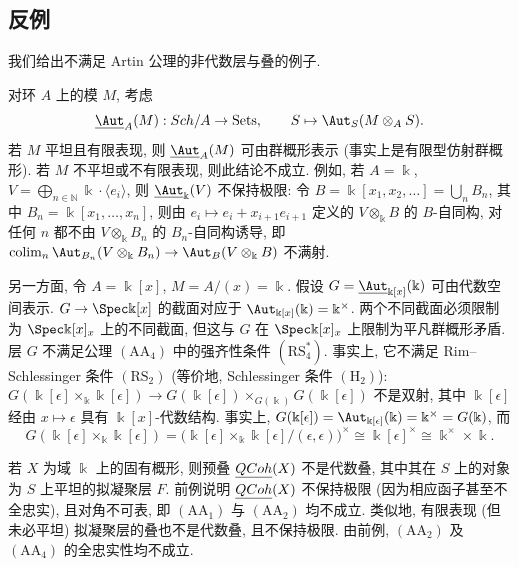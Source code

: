 \subsection{反例}\label{src:C.7.3-subsection}
我们给出不满足 Artin 公理的非代数层与叠的例子.
\begin{example}[模的自同构]\label{src:C.7.11}
对环 $A$ 上的模 $M$, 考虑
\[
\underline{\Aut}_A(M):\Sch/A\to\mathrm{Sets},\qquad S\mapsto\Aut_S(M\otimes_AS).
\]
若 $M$ 平坦且有限表现, 则 $\underline{\Aut}_A(M)$ 可由群概形表示 (事实上是有限型仿射群概形). 若 $M$ 不平坦或不有限表现, 则此结论不成立. 例如, 若 $A=\Bbbk$, $V=\bigoplus_{n\in\mathbb N}\Bbbk\cdot\langle e_i\rangle$, 则 $\underline{\Aut}_{\Bbbk}(V)$ 不保持极限: 令 $B=\Bbbk[x_1,x_2,\ldots]=\bigcup_nB_n$, 其中 $B_n=\Bbbk[x_1,\ldots,x_n]$, 则由 $e_i\mapsto e_i+x_{i+1}e_{i+1}$ 定义的 $V\otimes_{\Bbbk}B$ 的 $B$-自同构, 对任何 $n$ 都不由 $V\otimes_{\Bbbk}B_n$ 的 $B_n$-自同构诱导, 即 $\operatorname{colim}_n\Aut_{B_n}(V\otimes_{\Bbbk}B_n)\to\Aut_B(V\otimes_{\Bbbk}B)$ 不满射.

另一方面, 令 $A=\Bbbk[x]$, $M=A/(x)=\Bbbk$. 假设 $G=\underline{\Aut}_{\Bbbk[x]}(\Bbbk)$ 可由代数空间表示. $G\to\Spec\Bbbk[x]$ 的截面对应于 $\Aut_{\Bbbk[x]}(\Bbbk)=\Bbbk^\times$. 两个不同截面必须限制为 $\Spec\Bbbk[x]_x$ 上的不同截面, 但这与 $G$ 在 $\Spec\Bbbk[x]_x$ 上限制为平凡群概形矛盾. 层 $G$ 不满足公理 $(\mathrm{AA}_4)$ 中的强齐性条件 $(\mathrm{RS}_4^*)$. 事实上, 它不满足 Rim--Schlessinger 条件 $(\mathrm{RS}_2)$ (等价地, Schlessinger 条件 $(\mathrm H_2)$): $G(\Bbbk[\epsilon]\times_{\Bbbk}\Bbbk[\epsilon])\to G(\Bbbk[\epsilon])\times_{G(\Bbbk)}G(\Bbbk[\epsilon])$ 不是双射, 其中 $\Bbbk[\epsilon]$ 经由 $x\mapsto\epsilon$ 具有 $\Bbbk[x]$-代数结构. 事实上, $G(\Bbbk[\epsilon])=\Aut_{\Bbbk[\epsilon]}(\Bbbk)=\Bbbk^\times=G(\Bbbk)$, 而
\[
G(\Bbbk[\epsilon]\times_{\Bbbk}\Bbbk[\epsilon])=\bigl(\Bbbk[\epsilon]\times_{\Bbbk}\Bbbk[\epsilon]/(\epsilon,\epsilon)\bigr)^\times\cong\Bbbk[\epsilon]^\times\cong\Bbbk^\times\times\Bbbk.
\]
\end{example}
\begin{example}[拟凝聚层叠与非平坦凝聚层叠]\label{src:C.7.12}
若 $X$ 为域 $\Bbbk$ 上的固有概形, 则预叠 $\underline{QCoh}(X)$ 不是代数叠, 其中其在 $S$ 上的对象为 $S$ 上平坦的拟凝聚层 $F$. 前例说明 $\underline{QCoh}(X)$ 不保持极限 (因为相应函子甚至不全忠实), 且对角不可表, 即 $(\mathrm{AA}_1)$ 与 $(\mathrm{AA}_2)$ 均不成立. 类似地, 有限表现 (但未必平坦) 拟凝聚层的叠也不是代数叠, 且不保持极限. 由前例, $(\mathrm{AA}_2)$ 及 $(\mathrm{AA}_4)$ 的全忠实性均不成立.
\end{example}
